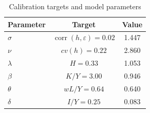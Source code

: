 \begin{table}[!htbp]
\centering
\caption{Calibration targets and model parameters}
\begin{tabular}{lcc}
\toprule
Parameter & Target & Value \\
\midrule
$\sigma$  & $\operatorname{corr}(h,\varepsilon)=0.02$ & 1.447 \\
$\nu$     & $cv(h)=0.22$ & 2.860 \\
$\lambda$ & $H=0.33$ & 1.053 \\
$\beta$   & $K/Y=3.00$ & 0.946 \\
$\theta$  & $wL/Y=0.64$ & 0.640 \\
$\delta$  & $I/Y=0.25$ & 0.083 \\
\bottomrule
\end{tabular}
\end{table}
